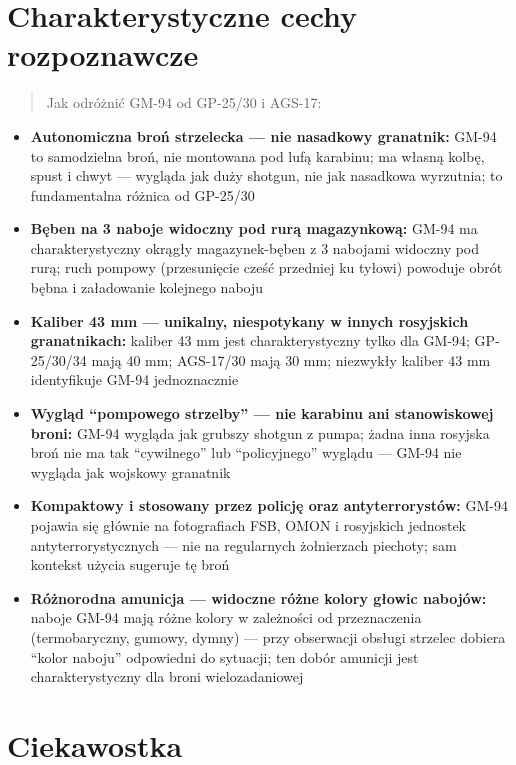\documentclass[12pt,openany,oneside]{book}
\providecommand{\tightlist}{%
  \setlength{\itemsep}{0pt}\setlength{\parskip}{0pt}}
\begin{document}
\section{Charakterystyczne cechy
rozpoznawcze}\label{charakterystyczne-cechy-rozpoznawcze-85}

\begin{quote}
Jak odróżnić GM-94 od GP-25/30 i AGS-17:
\end{quote}

\begin{itemize}
\tightlist
\item
  \textbf{Autonomiczna broń strzelecka --- nie nasadkowy granatnik:}
  GM-94 to samodzielna broń, nie montowana pod lufą karabinu; ma własną
  kolbę, spust i chwyt --- wygląda jak duży shotgun, nie jak nasadkowa
  wyrzutnia; to fundamentalna różnica od GP-25/30
\item
  \textbf{Bęben na 3 naboje widoczny pod rurą magazynkową:} GM-94 ma
  charakterystyczny okrągły magazynek-bęben z 3 nabojami widoczny pod
  rurą; ruch pompowy (przesunięcie cześć przedniej ku tyłowi) powoduje
  obrót bębna i załadowanie kolejnego naboju
\item
  \textbf{Kaliber 43 mm --- unikalny, niespotykany w innych rosyjskich
  granatnikach:} kaliber 43 mm jest charakterystyczny tylko dla GM-94;
  GP-25/30/34 mają 40 mm; AGS-17/30 mają 30 mm; niezwykły kaliber 43 mm
  identyfikuje GM-94 jednoznacznie
\item
  \textbf{Wygląd ``pompowego strzelby'' --- nie karabinu ani
  stanowiskowej broni:} GM-94 wygląda jak grubszy shotgun z pumpa; żadna
  inna rosyjska broń nie ma tak ``cywilnego'' lub ``policyjnego''
  wyglądu --- GM-94 nie wygląda jak wojskowy granatnik
\item
  \textbf{Kompaktowy i stosowany przez policję oraz antyterrorystów:}
  GM-94 pojawia się głównie na fotografiach FSB, OMON i rosyjskich
  jednostek antyterrorystycznych --- nie na regularnych żołnierzach
  piechoty; sam kontekst użycia sugeruje tę broń
\item
  \textbf{Różnorodna amunicja --- widoczne różne kolory głowic nabojów:}
  naboje GM-94 mają różne kolory w zależności od przeznaczenia
  (termobaryczny, gumowy, dymny) --- przy obserwacji obsługi strzelec
  dobiera ``kolor naboju'' odpowiedni do sytuacji; ten dobór amunicji
  jest charakterystyczny dla broni wielozadaniowej
\end{itemize}

\section{Ciekawostka}\label{ciekawostka-85}
\end{document}
